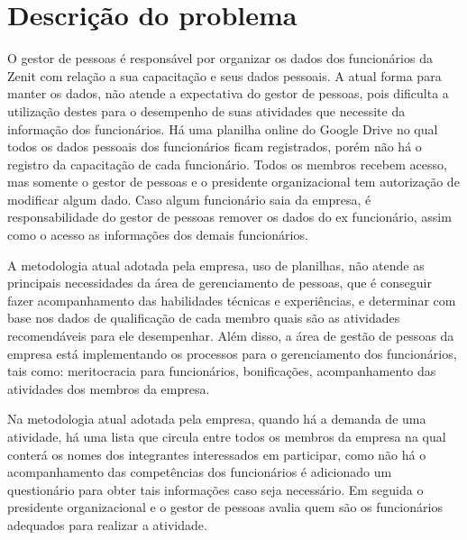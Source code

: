 \section[Descrição do problema]{Descrição do problema}\label{descricaoProblema}

O gestor de pessoas é responsável por organizar os dados dos funcionários da Zenit com relação a sua capacitação e seus dados pessoais. A atual forma para manter os dados, não atende a expectativa do gestor de pessoas, pois dificulta a utilização destes para o desempenho de suas atividades que necessite da informação dos funcionários. Há uma planilha online do Google Drive no qual todos os dados pessoais dos funcionários ficam registrados, porém não há o registro da capacitação de cada funcionário. Todos os membros recebem acesso, mas somente  o gestor de pessoas e o presidente organizacional tem autorização de modificar algum dado. Caso algum funcionário saia da empresa, é responsabilidade do gestor de pessoas remover os dados do ex funcionário, assim como o acesso as informações dos demais funcionários.

A metodologia atual adotada pela empresa, uso de planilhas,  não atende as principais necessidades  da área de gerenciamento de pessoas, que é conseguir fazer acompanhamento das habilidades técnicas e experiências, e determinar com base nos dados de qualificação de cada membro quais são as atividades recomendáveis para ele desempenhar. Além disso, a área de gestão de pessoas da empresa está implementando os processos para o gerenciamento dos funcionários, tais como: meritocracia para funcionários, bonificações, acompanhamento das atividades dos membros da empresa.

Na metodologia atual adotada pela empresa, quando há a demanda de uma atividade, há uma lista que circula entre todos os membros da empresa na qual conterá os nomes dos integrantes interessados em participar, como não há o acompanhamento das competências dos funcionários é adicionado um questionário para obter tais informações caso seja necessário. Em seguida o presidente organizacional e o gestor de pessoas avalia quem são os funcionários adequados para realizar a atividade.


